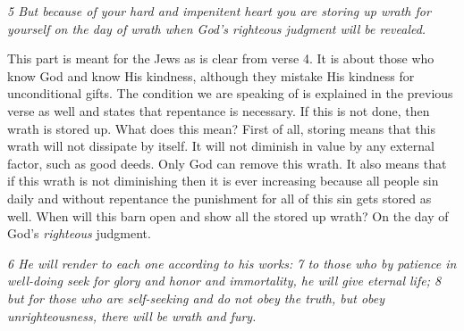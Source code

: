 \emph{5 But because of your hard and impenitent heart you are storing up
wrath for yourself on the day of wrath when God's righteous judgment
will be revealed.}

This part is meant for the Jews as is clear from verse 4. It is about
those who know God and know His kindness, although they mistake His
kindness for unconditional gifts. The condition we are speaking of is
explained in the previous verse as well and states that repentance is
necessary. If this is not done, then wrath is stored up. What does this
mean? First of all, storing means that this wrath will not dissipate by
itself. It will not diminish in value by any external factor, such as
good deeds. Only God can remove this wrath. It also means that if this
wrath is not diminishing then it is ever increasing because all people
sin daily and without repentance the punishment for all of this sin gets
stored as well. When will this barn open and show all the stored up
wrath? On the day of God's \emph{righteous} judgment.

\emph{6 He will render to each one according to his works: 7 to those
who by patience in well-doing seek for glory and honor and immortality,
he will give eternal life; 8 but for those who are self-seeking and do
not obey the truth, but obey unrighteousness, there will be wrath and
fury.}

